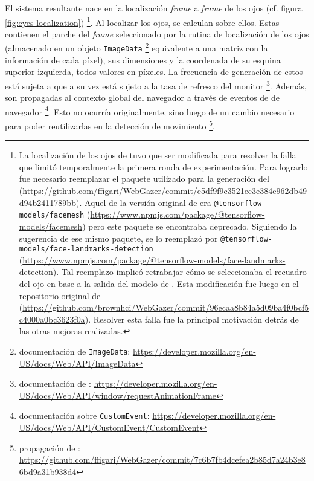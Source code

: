   El sistema resultante nace en la localización \textit{frame} a \textit{frame}
  de los ojos (cf. figura \ref{fig:eyes-localization})
  \footnote{
    La localización de los ojos de \webgazer tuvo que ser modificada para
    resolver la falla que limitó temporalmente la primera ronda de
    experimentación.
    Para lograrlo fue necesario reemplazar el paquete utilizado para la
    generación del \facemesh
    (\url{https://github.com/ffigari/WebGazer/commit/e5df9f9c3521ec3e384e962db49d94b2411789bb}).
    Aquel de la versión original de \webgazer era
    \texttt{@tensorflow-models/facemesh}
    (\url{https://www.npmjs.com/package/@tensorflow-models/facemesh}) pero este
    paquete se encontraba deprecado.
    Siguiendo la sugerencia de ese mismo paquete, se lo reemplazó por
    \texttt{@tensorflow-models/face-landmarks-detection}
    (\url{https://www.npmjs.com/package/@tensorflow-models/face-landmarks-detection}).
    Tal reemplazo implicó retrabajar cómo se seleccionaba el recuadro del ojo
    en base a la salida del modelo de \facemesh.
    Esta modificación fue luego \mergeada en el repositorio original de
    \webgazer
    (\url{https://github.com/brownhci/WebGazer/commit/96ecaa8b84a5d09ba4f0bcf5c4000a0bc3623f0a}).
    Resolver esta falla fue la principal motivación detrás de las otras mejoras
    realizadas.
  }.
  Al localizar los ojos, se calculan \features sobre ellos.
  Estas contienen el parche del \textit{frame} seleccionado por la rutina de
  localización de los ojos (almacenado en un objeto \texttt{ImageData}
  \footnote{
    documentación de \texttt{ImageData}:
    \url{https://developer.mozilla.org/en-US/docs/Web/API/ImageData}
  } equivalente a una matriz con la información de cada píxel), sus dimensiones
  y la coordenada de su esquina superior izquierda, todos valores en píxeles.
  La frecuencia de generación de estos \features está sujeta a \raf que a su
  vez está sujeto a la tasa de refresco del monitor \footnote{
    documentación de \raf:
    \url{https://developer.mozilla.org/en-US/docs/Web/API/window/requestAnimationFrame}
  }.
  Además, son propagadas al contexto global del navegador a través de eventos
  de \js de navegador \footnote{
    documentación sobre \texttt{CustomEvent}:
    \url{https://developer.mozilla.org/en-US/docs/Web/API/CustomEvent/CustomEvent}
  }.
  Esto no ocurría originalmente, sino luego de un cambio necesario para poder
  reutilizarlas en la detección de movimiento \footnote{
    propagación de \features:
    \url{https://github.com/ffigari/WebGazer/commit/7c6b7fb4dcefea2b85d7a24b3e86bd9a31b938d4}
  }.

